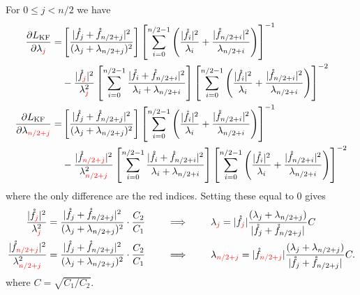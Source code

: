 \documentclass{amsart}
\begin{document}
For $0 \leq j < n/2$ we have 
\begin{align*}
    \frac{\partial L_\mathrm{KF}}{\partial \lambda_{\textcolor{red}{j}}} 
    =& \left[\frac{\lvert \mathring{f}_j + \mathring{f}_{n/2+j} \rvert^2}{(\lambda_j + \lambda_{n/2+j})^2}\right] \left[\sum_{i=0}^{n/2-1} \left(\frac{\lvert \mathring{f}_i \rvert^2}{\lambda_i} + \frac{\lvert \mathring{f}_{n/2+i} \rvert^2}{\lambda_{n/2+i}} \right)\right]^{-1} \\
    &- \frac{\lvert \mathring{f}_{\textcolor{red}{j}} \rvert^2}{\lambda_{\textcolor{red}{j}}^2} \left[\sum_{i=0}^{n/2-1} \frac{\lvert \mathring{f}_i + \mathring{f}_{n/2+i} \rvert^2}{\lambda_i + \lambda_{n/2+i}}\right] \left[\sum_{i=0}^{n/2-1} \left(\frac{\lvert \mathring{f}_i \rvert^2}{\lambda_i} + \frac{\lvert \mathring{f}_{n/2+i} \rvert^2}{\lambda_{n/2+i}} \right)\right]^{-2} \\
    \frac{\partial L_\mathrm{KF}}{\partial \lambda_{\textcolor{red}{n/2+j}}}
    =& \left[\frac{\lvert \mathring{f}_j + \mathring{f}_{n/2+j} \rvert^2}{(\lambda_j + \lambda_{n/2+j})^2}\right] \left[\sum_{i=0}^{n/2-1} \left(\frac{\lvert \mathring{f}_i \rvert^2}{\lambda_i} + \frac{\lvert \mathring{f}_{n/2+i} \rvert^2}{\lambda_{n/2+i}} \right)\right]^{-1} \\
    &- \frac{\lvert \mathring{f}_{\textcolor{red}{n/2+j}} \rvert^2}{\lambda_{\textcolor{red}{n/2+j}}^2} \left[\sum_{i=0}^{n/2-1} \frac{\lvert \mathring{f}_i + \mathring{f}_{n/2+i} \rvert^2}{\lambda_i + \lambda_{n/2+i}}\right] \left[\sum_{i=0}^{n/2-1} \left(\frac{\lvert \mathring{f}_i \rvert^2}{\lambda_i} + \frac{\lvert \mathring{f}_{n/2+i} \rvert^2}{\lambda_{n/2+i}} \right)\right]^{-2} 
\end{align*}
where the only difference are the red indices. Setting these equal to $0$ gives 
\begin{align*}
    \frac{\lvert \mathring{f}_{\textcolor{red}{j}} \rvert^2}{\lambda_{\textcolor{red}{j}}^2} 
    &= \frac{\lvert \mathring{f}_j + \mathring{f}_{n/2+j} \rvert^2}{(\lambda_j + \lambda_{n/2+j})^2} \cdot \frac{C_2}{C_1} \qquad\implies\qquad \lambda_{\textcolor{red}{j}} = \lvert \mathring{f}_{\textcolor{red}{j}} \rvert \frac{(\lambda_j + \lambda_{n/2+j})}{\lvert \mathring{f}_j + \mathring{f}_{n/2+j} \rvert} C \\
    \frac{\lvert \mathring{f}_{\textcolor{red}{n/2+j}} \rvert^2}{\lambda_{\textcolor{red}{n/2+j}}^2} 
    &= \frac{\lvert \mathring{f}_j + \mathring{f}_{n/2+j} \rvert^2}{(\lambda_j + \lambda_{n/2+j})^2} \cdot \frac{C_2}{C_1} \qquad\implies\qquad \lambda_{\textcolor{red}{n/2+j}} = \lvert \mathring{f}_{\textcolor{red}{n/2+j}} \rvert \frac{(\lambda_j + \lambda_{n/2+j})}{\lvert \mathring{f}_j + \mathring{f}_{n/2+j} \rvert} C.
\end{align*}
where $C = \sqrt{C_1/C_2}$.
\end{document}
